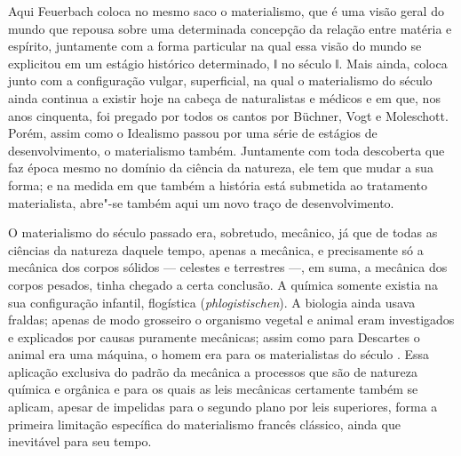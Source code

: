 Aqui
Feuerbach coloca
no mesmo saco o materialismo, que é uma visão geral do mundo que repousa
sobre uma determinada concepção da relação entre matéria e espírito,
juntamente com a forma particular na qual essa visão do mundo se
explicitou em um estágio histórico determinado, ǁ no século  ǁ.
Mais ainda, coloca junto com a configuração vulgar, superficial, na qual
o materialismo do século  ainda continua a existir hoje na cabeça
de naturalistas e médicos e em que, nos anos cinquenta, foi pregado por
todos os cantos
por Büchner, Vogt e Moleschott. Porém,
assim como o Idealismo passou por uma série de estágios de
desenvolvimento, o materialismo também. Juntamente com toda descoberta
que faz época mesmo no domínio da ciência da natureza, ele tem que mudar
a sua forma; e na medida em que também a história está submetida ao
tratamento materialista, abre"-se também aqui um novo traço de
desenvolvimento.

O materialismo do século passado era, sobretudo, mecânico, já que de
todas as ciências da natureza daquele tempo, apenas a mecânica, e
precisamente só a mecânica dos corpos sólidos --- celestes e terrestres ---,
em suma, a mecânica dos corpos pesados, tinha chegado a certa conclusão.
A química somente existia na sua configuração infantil, flogística
(\emph{phlogistischen}). A biologia ainda
usava fraldas; apenas de modo grosseiro o organismo vegetal e animal
eram investigados e explicados por causas puramente mecânicas; assim
como
para Descartes o
animal era uma máquina, o homem era para os materialistas do século
. Essa aplicação exclusiva do padrão da mecânica a processos que
são de natureza química e orgânica e para os quais as leis mecânicas
certamente também se aplicam, apesar de impelidas para o segundo plano
por leis superiores, forma a primeira limitação específica do
materialismo francês clássico, ainda que inevitável para seu tempo.

